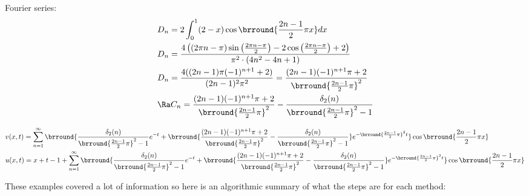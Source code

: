 Fourier series:
\begin{align*}
    &D_n=2\int_0^1(2-x)\cos\brround{\frac{2n-1}{2}\pi x}dx\\
    &D_n=\dfrac{4\left(\left(2{\pi}n-{\pi}\right)\sin\left(\frac{2{\pi}n-{\pi}}{2}\right)-2\cos\left(\frac{2{\pi}n-{\pi}}{2}\right)+2\right)}{{\pi}^2\cdot\left(4n^2-4n+1\right)}\\
    &D_n=\frac{4((2n-1)\pi(-1)^{n+1}+2)}{(2n-1)^2\pi^2}=\frac{(2n-1)(-1)^{n+1}\pi+2}{\brround{\frac{2n-1}{2}\pi}^2}\\
    &\Ra C_n=\frac{(2n-1)(-1)^{n+1}\pi+2}{\brround{\frac{2n-1}{2}\pi}^2}-\frac{\delta_2(n)}{\brround{\frac{2n-1}{2}\pi}^2-1}
\end{align*}
\begin{scriptsize}
\begin{align*}
    &v(x,t)=\sum_{n=1}^\infty\brround{\frac{\delta_2(n)}{\brround{\frac{2n-1}{2}\pi}^2-1}e^{-t}+\brround{\frac{(2n-1)(-1)^{n+1}\pi+2}{\brround{\frac{2n-1}{2}\pi}^2}-\frac{\delta_2(n)}{\brround{\frac{2n-1}{2}\pi}^2-1}}e^{-\brround{\frac{2n-1}{2}\pi}^2t}}\cos\brround{\frac{2n-1}{2}\pi x}\\
    &u(x,t)=x+t-1+\sum_{n=1}^\infty\brround{\frac{\delta_2(n)}{\brround{\frac{2n-1}{2}\pi}^2-1}e^{-t}+\brround{\frac{(2n-1)(-1)^{n+1}\pi+2}{\brround{\frac{2n-1}{2}\pi}^2}-\frac{\delta_2(n)}{\brround{\frac{2n-1}{2}\pi}^2-1}}e^{-\brround{\frac{2n-1}{2}\pi}^2t}}\cos\brround{\frac{2n-1}{2}\pi x}
\end{align*}
\end{scriptsize}

These examples covered a lot of information so here is an algorithmic summary of what the steps are for each method:\\

